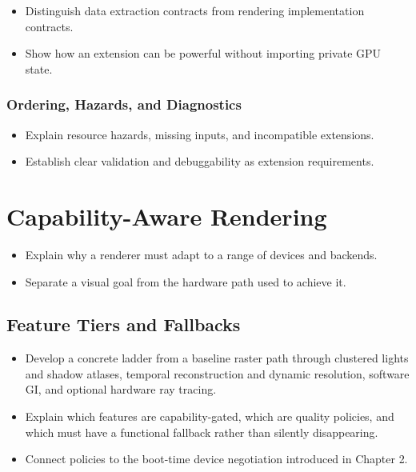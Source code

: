 \documentclass[
  11pt,
  letterpaper,
  DIV=11,
  numbers=noendperiod,
  twoside,
  open=right]{scrreprt}
\providecommand{\tightlist}{%
  \setlength{\itemsep}{0pt}\setlength{\parskip}{0pt}}
\begin{document}
\begin{itemize}
\tightlist
\item
  Distinguish data extraction contracts from rendering implementation
  contracts.
\item
  Show how an extension can be powerful without importing private GPU
  state.
\end{itemize}

\subsubsection{Ordering, Hazards, and
Diagnostics}\label{ordering-hazards-and-diagnostics}

\begin{itemize}
\tightlist
\item
  Explain resource hazards, missing inputs, and incompatible extensions.
\item
  Establish clear validation and debuggability as extension
  requirements.
\end{itemize}

\section{Capability-Aware Rendering}\label{capability-aware-rendering}

\begin{itemize}
\tightlist
\item
  Explain why a renderer must adapt to a range of devices and backends.
\item
  Separate a visual goal from the hardware path used to achieve it.
\end{itemize}

\subsection{Feature Tiers and
Fallbacks}\label{feature-tiers-and-fallbacks}

\begin{itemize}
\tightlist
\item
  Develop a concrete ladder from a baseline raster path through
  clustered lights and shadow atlases, temporal reconstruction and
  dynamic resolution, software GI, and optional hardware ray tracing.
\item
  Explain which features are capability-gated, which are quality
  policies, and which must have a functional fallback rather than
  silently disappearing.
\item
  Connect policies to the boot-time device negotiation introduced in
  Chapter 2.
\end{itemize}
\end{document}
